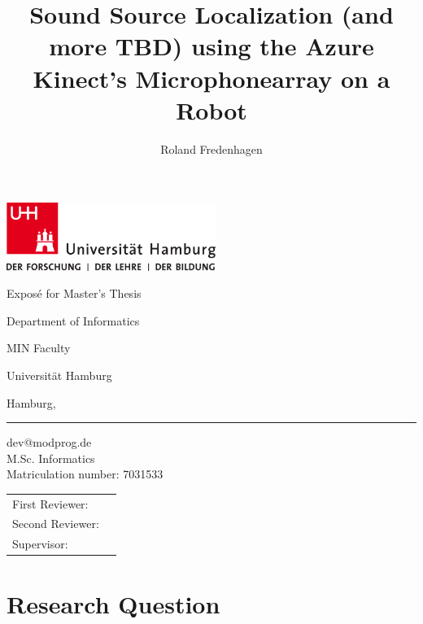 \documentclass[
    fontsize=12pt,
    headings=small,
    parskip=half,           %
    bibliography=totoc,
    numbers=noenddot,       %
    open=any,               %
      final                   %
]{scrreprt}
\title{Sound Source Localization (and more TBD) using the Azure Kinect's
    Microphonearray on a Robot}
\author{Roland Fredenhagen}
\newcommand{\firstreviewer}{}
\newcommand{\secondreviewer}{}
\newcommand{\supervisor}{}
\begin{document}
\begin{titlepage}
    \includegraphics[width=6.8cm]{../pic/up-uhh-logo-u-2010-u-farbe-u-rgb.pdf}
    \makeatletter
    \begin{center}\Large
        \bigskip
        Exposé for Master's Thesis\par
        \bigskip
        {\Large\textsf{\textbf{\@title}}\par}
        \bigskip
        Department of Informatics \par
        MIN Faculty \par
        Universität Hamburg\par
        \bigskip
        Hamburg, {\@date}
        \vfill
    \end{center}
    \large
    \textbf{\@author} \par
    \smallskip
    \hrule
    dev@modprog.de \\
    M.Sc. Informatics \\
    Matriculation number: 7031533 \par
    \bigskip
    \begin{tabular}{@{}ll}
        First Reviewer:  & \firstreviewer  \\
        Second Reviewer: & \secondreviewer \\
        Supervisor:      & \supervisor     \\
    \end{tabular}
\end{titlepage}

\chapter{Research Question}
\label{question}
\end{document}
